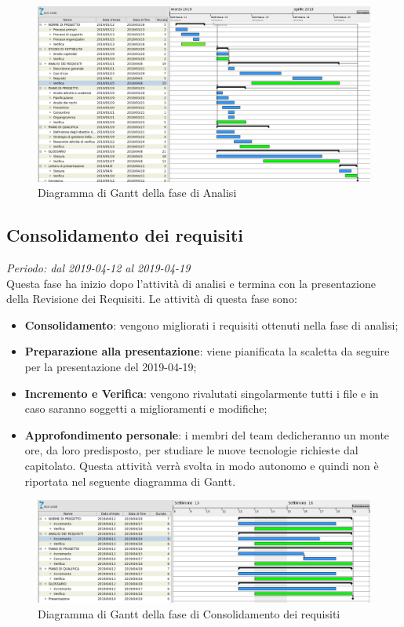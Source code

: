 \begin{figure}[H]
	\includegraphics[width=0.99\linewidth]{res/images/gantt_analisi.png}
	\caption{Diagramma di Gantt della fase di Analisi}
\end{figure}

\subsection{Consolidamento dei requisiti}
\textit{Periodo: dal 2019-04-12 al 2019-04-19} \\
Questa fase ha inizio dopo l'attività di analisi e termina con la presentazione della Revisione dei Requisiti. Le attività 
di questa fase sono:
\begin{itemize}
	\item \textbf{Consolidamento}: vengono migliorati i requisiti ottenuti nella fase di analisi;
	\item \textbf{Preparazione alla presentazione}: viene pianificata la scaletta da seguire per la presentazione del 2019-04-19;
	\item \textbf{Incremento e Verifica}: vengono rivalutati singolarmente tutti i file e in caso saranno soggetti a miglioramenti e modifiche;
	\item \textbf{Approfondimento personale}: i membri del team dedicheranno un monte ore, da loro predisposto, per studiare le nuove tecnologie richieste dal capitolato\glo. Questa attività verrà svolta in modo autonomo e quindi non è riportata nel seguente diagramma di Gantt\glo.
\end{itemize}

\begin{figure}[H]
	\includegraphics[width=0.99\linewidth]{res/images/gantt_cons.png}
	\caption{Diagramma di Gantt della fase di Consolidamento dei requisiti}
\end{figure}

